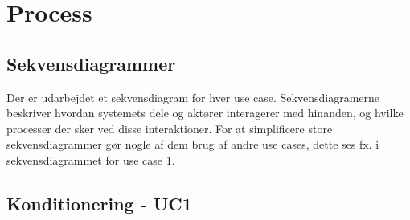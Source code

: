 \newpage
\section{Process}

\subsection{Sekvensdiagrammer}
Der er udarbejdet et sekvensdiagram for hver use case. Sekvensdiagramerne beskriver hvordan systemets dele og aktører interagerer med hinanden, og hvilke processer der sker ved disse interaktioner. 
For at simplificere store sekvensdiagrammer gør nogle af dem brug af andre use cases, dette ses fx. i sekvensdiagrammet for use case 1. 


\newpage
\subsection{Konditionering - UC1} 
\hspace{2cm}
